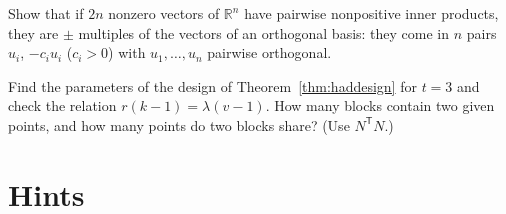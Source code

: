 \begin{exercise}[$\star\star$]\label{ex:obtuseeq}
Show that if $2n$ nonzero vectors of $\mathbb R^n$ have pairwise nonpositive inner products, they are $\pm$ multiples of the vectors of an orthogonal
basis: they come in $n$ pairs $u_i$, $-c_iu_i$ ($c_i>0$) with $u_1,\dots,u_n$ pairwise orthogonal.
\end{exercise}

\begin{exercise}[$\star$]\label{ex:biplane}
Find the parameters of the design of Theorem~\ref{thm:haddesign} for $t=3$ and check the relation $r(k-1)=\lambda(v-1)$. How many blocks contain two
given points, and how many points do two blocks share? (Use $N^{\mathsf T}N$.)
\end{exercise}

\section{Hints}

